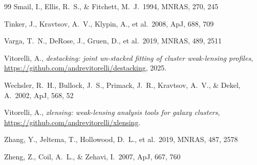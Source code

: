 \documentclass[11pt,a4paper]{article}
\providecommand{\mnras}{MNRAS}
\providecommand{\apj}{ApJ}
\begin{document}
\begin{thebibliography}{99}
Smail, I., Ellis, R.~S., \& Fitchett, M.~J.\ 1994, \mnras, 270, 245

Tinker, J., Kravtsov, A.~V., Klypin, A., et al.\ 2008, \apj, 688, 709

Varga, T.~N., DeRose, J., Gruen, D., et al.\ 2019, \mnras, 489, 2511

Vitorelli, A., \textit{destacking: joint un-stacked fitting of cluster
weak-lensing profiles}, \url{https://github.com/andrevitorelli/destacking}, 2025.

Wechsler, R.~H., Bullock, J.~S., Primack, J.~R., Kravtsov, A.~V., \& Dekel, A.\ 2002, \apj, 568, 52

Vitorelli, A., \textit{xlensing: weak-lensing analysis tools for galaxy clusters},
\url{https://github.com/andrevitorelli/xlensing}.

Zhang, Y., Jeltema, T., Hollowood, D.~L., et al.\ 2019, \mnras, 487, 2578

Zheng, Z., Coil, A.~L., \& Zehavi, I.\ 2007, \apj, 667, 760

\end{thebibliography}
\end{document}
